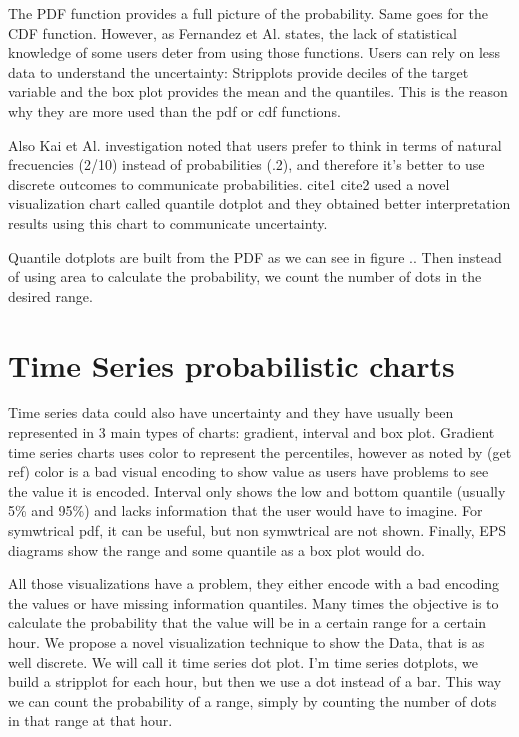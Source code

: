 \documentclass[a4paper,3p,sort&compress]{elsarticle}
\begin{document}
The PDF function provides a full picture of the probability. Same goes for the CDF function. However, as Fernandez et Al. states, the lack of statistical knowledge of some users deter from using those functions.  
Users can rely on less data to understand the uncertainty: Stripplots provide deciles of the target variable and the box plot provides the mean and the quantiles. This is the reason why they are more used than the pdf or cdf functions.

Also Kai et Al. investigation noted that users prefer to think in terms of natural frecuencies (2/10) instead of probabilities (.2), and therefore it's better to use discrete outcomes to communicate probabilities. cite1 cite2 used a novel visualization chart called quantile dotplot and they obtained better interpretation results using this chart to communicate uncertainty.

Quantile dotplots are built from the PDF as we can see in figure .. Then instead of using area to calculate the probability, we count the number of dots in the desired range.

\section{Time Series probabilistic charts}
\label{sec:time_series}

Time series data could also have uncertainty and they have usually been represented in 3 main types of charts: gradient, interval and box plot. Gradient time series charts uses color to represent the percentiles, however as noted by (get ref) color is a bad visual encoding to show value as users have problems to see the value it is encoded.
Interval only shows the low and bottom quantile (usually 5\% and 95\%) and lacks information that the user would have to imagine. For symwtrical pdf, it can be useful, but non symwtrical are not shown.
Finally, EPS diagrams show the range and some quantile as a box plot would do.

All those visualizations have a problem, they either encode with a bad encoding the values or have missing information quantiles. 
Many times the objective is to calculate the probability that the value will be in a certain range for a certain hour.
We propose a novel visualization technique to show the Data, that is as well discrete. We will call it time series dot plot. I'm time series dotplots, we build a stripplot for each hour, but then we use a dot instead of a bar. This way we can count the probability of a range, simply by counting the number of dots in that range at that hour.
\end{document}
